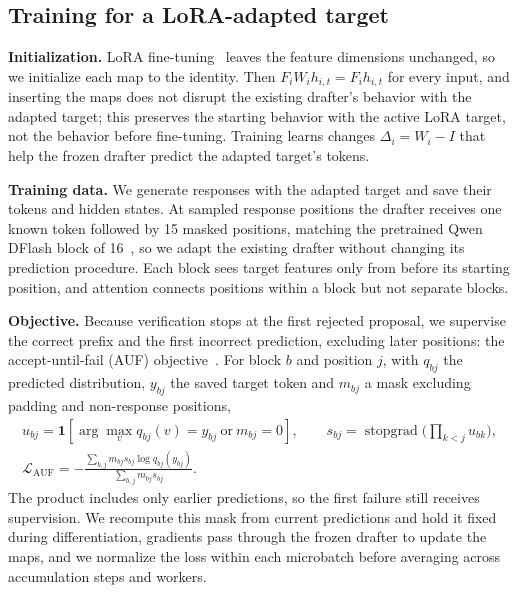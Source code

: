 \subsection{Training for a LoRA-adapted target}
\label{sec:method-auf}
\textbf{Initialization.} LoRA fine-tuning~\citep{hu2022lora} leaves the feature dimensions unchanged, so we initialize each map to the identity. Then $F_iW_ih_{i,t}=F_ih_{i,t}$ for every input, and inserting the maps does not disrupt the existing drafter's behavior with the adapted target; this preserves the starting behavior with the active LoRA target, not the behavior before fine-tuning. Training learns changes $\Delta_i=W_i-I$ that help the frozen drafter predict the adapted target's tokens.

\textbf{Training data.} We generate responses with the adapted target and save their tokens and hidden states. At sampled response positions the drafter receives one known token followed by 15 masked positions, matching the pretrained Qwen DFlash block of 16~\citep{chen2026dflash}, so we adapt the existing drafter without changing its prediction procedure. Each block sees target features only from before its starting position, and attention connects positions within a block but not separate blocks.

\textbf{Objective.} Because verification stops at the first rejected proposal, we supervise the correct prefix and the first incorrect prediction, excluding later positions: the accept-until-fail (AUF) objective~\citep{yang2026specauf}. For block $b$ and position $j$, with $q_{bj}$ the predicted distribution, $y_{bj}$ the saved target token and $m_{bj}$ a mask excluding padding and non-response positions,
\begin{equation}
 \begin{gathered}
 u_{bj}=\mathbf 1\!\left[\arg\max_v q_{bj}(v)=y_{bj}\ \text{or}\ m_{bj}=0\right],
 \qquad s_{bj}=\operatorname{stopgrad}\bigl({\textstyle\prod_{k<j}u_{bk}}\bigr),\\
 \mathcal L_{\mathrm{AUF}}
 =-\frac{\sum_{b,j}m_{bj}s_{bj}\log q_{bj}(y_{bj})}
 {\sum_{b,j}m_{bj}s_{bj}}.
 \end{gathered}
 \label{eq:auf-method}
\end{equation}
The product includes only earlier predictions, so the first failure still receives supervision. We recompute this mask from current predictions and hold it fixed during differentiation, gradients pass through the frozen drafter to update the maps, and we normalize the loss within each microbatch before averaging across accumulation steps and workers.


